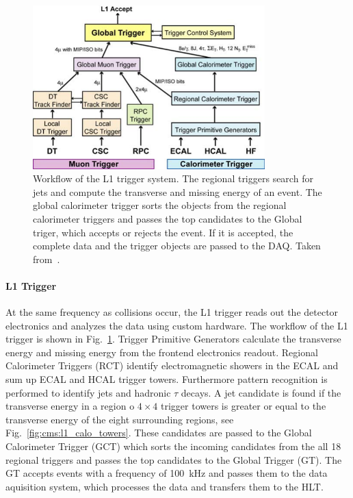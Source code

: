 \begin{figure}[htp]
    \centering
    \includegraphics[width=0.8\textwidth]{figures/cms_detector/cms_l1_trigger_new.pdf}\hfill
    \caption[The L1 Trigger of CMS]{Workflow of the L1 trigger system. The
        regional triggers search for jets and compute the transverse and missing
        energy of an event. The global calorimeter trigger sorts the objects
        from the regional calorimeter triggers and passes the top candidates to
        the Global triger, which accepts or rejects the event. If it is
        accepted, the complete data and the trigger objects are passed to the
        DAQ. Taken from~\cite{Bayatian:922757}.} 
    \label{fig:cms:l1_trigger}
\end{figure}

\paragraph{L1 Trigger} 
At the same frequency as collisions occur, the L1 trigger reads out the detector
electronics and analyzes the data using custom hardware. The workflow of the L1
trigger is shown in Fig.~\ref{fig:cms:l1_trigger}. Trigger Primitive Generators
calculate the transverse energy and missing energy from the frontend electronics
readout. Regional Calorimeter Triggers (RCT) identify electromagnetic showers
in the ECAL and sum up ECAL and HCAL trigger towers. Furthermore pattern
recognition is performed to identify jets and hadronic $\tau$ decays. A jet
candidate is found if the transverse energy in a region o $4\times4$ trigger
towers is greater or equal to the transverse energy of the eight surrounding
regions, see Fig.~\ref{fig:cms:l1_calo_towers}. These
candidates are passed to the Global Calorimeter Trigger (GCT) which sorts the
incoming candidates from the all 18 regional triggers and passes the top
candidates to the Global Trigger (GT). The GT accepts events with a frequency
of \SI{100}{\kilo\hertz} and passes them to the data aquisition system, which
processes the data and transfers them to the HLT.

